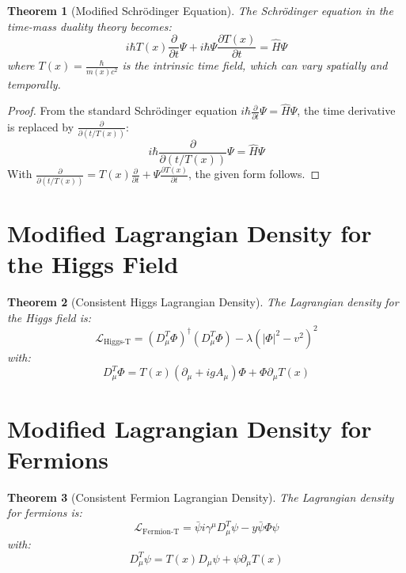 \documentclass[a4paper,12pt]{article}
\newtheorem{theorem}{Theorem}[section]
\begin{document}
	\begin{theorem}[Modified Schrödinger Equation]
		The Schrödinger equation in the time-mass duality theory becomes:
		\begin{equation}
			i\hbar T(x) \frac{\partial}{\partial t} \Psi + i\hbar \Psi \frac{\partial T(x)}{\partial t} = \hat{H} \Psi
		\end{equation}
		where \( T(x) = \frac{\hbar}{m(x) c^2} \) is the intrinsic time field, which can vary spatially and temporally.
	\end{theorem}
	
	\begin{proof}
		From the standard Schrödinger equation \( i\hbar \frac{\partial}{\partial t} \Psi = \hat{H} \Psi \), the time derivative is replaced by \( \frac{\partial}{\partial (t/T(x))} \):
		\begin{equation}
			i\hbar \frac{\partial}{\partial (t/T(x))} \Psi = \hat{H} \Psi
		\end{equation}
		With \( \frac{\partial}{\partial (t/T(x))} = T(x) \frac{\partial}{\partial t} + \Psi \frac{\partial T(x)}{\partial t} \), the given form follows.
	\end{proof}
	
	\section{Modified Lagrangian Density for the Higgs Field}
	
	\begin{theorem}[Consistent Higgs Lagrangian Density]
		The Lagrangian density for the Higgs field is:
		\begin{equation}
			\mathcal{L}_{\text{Higgs-T}} = (D_\mu^T \Phi)^\dagger (D_\mu^T \Phi) - \lambda (|\Phi|^2 - v^2)^2
		\end{equation}
		with:
		\begin{equation}
			D_\mu^T \Phi = T(x) (\partial_\mu + i g A_\mu) \Phi + \Phi \partial_\mu T(x)
		\end{equation}
	\end{theorem}
	
	\section{Modified Lagrangian Density for Fermions}
	
	\begin{theorem}[Consistent Fermion Lagrangian Density]
		The Lagrangian density for fermions is:
		\begin{equation}
			\mathcal{L}_{\text{Fermion-T}} = \bar{\psi} i \gamma^\mu D_\mu^T \psi - y \bar{\psi} \Phi \psi
		\end{equation}
		with:
		\begin{equation}
			D_\mu^T \psi = T(x) D_\mu \psi + \psi \partial_\mu T(x)
		\end{equation}
	\end{theorem}
	
\end{document}
